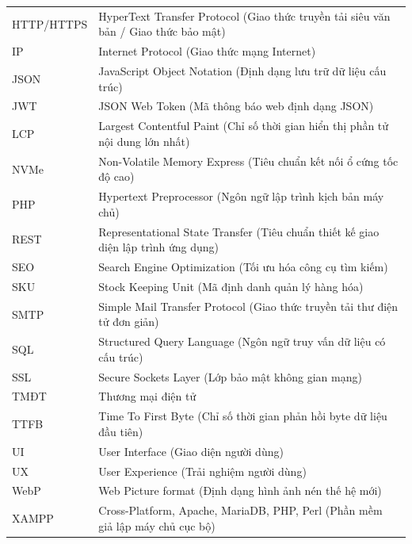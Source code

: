 \begin{longtable}{>{\raggedright\arraybackslash}p{4.2cm} >{\raggedright\arraybackslash}p{10.3cm}}
    \addlinespace
    HTTP/HTTPS & HyperText Transfer Protocol (Giao thức truyền tải siêu văn bản / Giao thức bảo mật) \\
    \addlinespace
    IP & Internet Protocol (Giao thức mạng Internet) \\
    \addlinespace
    JSON & JavaScript Object Notation (Định dạng lưu trữ dữ liệu cấu trúc) \\
    \addlinespace
    JWT & JSON Web Token (Mã thông báo web định dạng JSON) \\
    \addlinespace
    LCP & Largest Contentful Paint (Chỉ số thời gian hiển thị phần tử nội dung lớn nhất) \\
    \addlinespace
    NVMe & Non-Volatile Memory Express (Tiêu chuẩn kết nối ổ cứng tốc độ cao) \\
    \addlinespace
    PHP & Hypertext Preprocessor (Ngôn ngữ lập trình kịch bản máy chủ) \\
    \addlinespace
    REST & Representational State Transfer (Tiêu chuẩn thiết kế giao diện lập trình ứng dụng) \\
    \addlinespace
    SEO & Search Engine Optimization (Tối ưu hóa công cụ tìm kiếm) \\
    \addlinespace
    SKU & Stock Keeping Unit (Mã định danh quản lý hàng hóa) \\
    \addlinespace
    SMTP & Simple Mail Transfer Protocol (Giao thức truyền tải thư điện tử đơn giản) \\
    \addlinespace
    SQL & Structured Query Language (Ngôn ngữ truy vấn dữ liệu có cấu trúc) \\
    \addlinespace
    SSL & Secure Sockets Layer (Lớp bảo mật không gian mạng) \\
    \addlinespace
    TMĐT & Thương mại điện tử \\
    \addlinespace
    TTFB & Time To First Byte (Chỉ số thời gian phản hồi byte dữ liệu đầu tiên) \\
    \addlinespace
    UI & User Interface (Giao diện người dùng) \\
    \addlinespace
    UX & User Experience (Trải nghiệm người dùng) \\
    \addlinespace
    WebP & Web Picture format (Định dạng hình ảnh nén thế hệ mới) \\
    \addlinespace
    XAMPP & Cross-Platform, Apache, MariaDB, PHP, Perl (Phần mềm giả lập máy chủ cục bộ) \\
    \bottomrule
\end{longtable}
